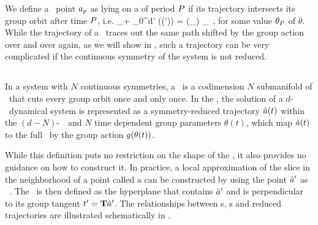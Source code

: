We define a \statesp\ point $a_{p}$ as lying on a \emph{\rpo} of period $P$ if its trajectory intersects its group orbit after time $P$, i.e.
\beq
  \ssp_\rpprime  + \int_0^\pd d\tau' \vel(\ssp (\tau')) = \LieEl (\theta_\rpprime ) \ssp_\rpprime
  \,,
\noindent for some value $\theta_{P}$ of $\theta$. While the trajectory of a \rpo\ traces out the same path shifted
by the group action over and over again, as we will show in , such a trajectory can be very complicated if the
continuous symmetry of the system is not reduced.

\subsection{\Mslices}
\label{s-slice}

In a system with $N$ continuous symmetries, a \emph{\slice} \pSRed\ is a codimension $N$ submanifold 
of \pS\ that cuts every group orbit once and only once. In the \emph{\mslices}, the solution
of a $d$-\dmn\ dynamical system is represented as a symmetry-reduced trajectory $\hat{a} (t)$ within the
$(d-N)$-\dmn\ \slice\ and $N$ time dependent group parameters $\theta(t)$, which
map $\hat{a} (t)$ to the full \statesp\ by the group action $g(\theta(t))$.

While this definition puts no restriction on the shape of the
\slice, it also provides no guidance on how to construct it.
In practice, a local approximation of the slice in the neighborhood of a point called a \emph{\slicePlane}
can be constructed by using the point ${\hat{a}'}$ as \emph{\template\ }. The \slicePlane\ is then defined as the hyperplane
that contains ${\hat{a}'}$ and is perpendicular to its group tangent $t'_{} = \mathbf{T} {\hat{a}'}$.
The relationships between \slicePlane s, \template s and reduced trajectories are illustrated schematically in .

